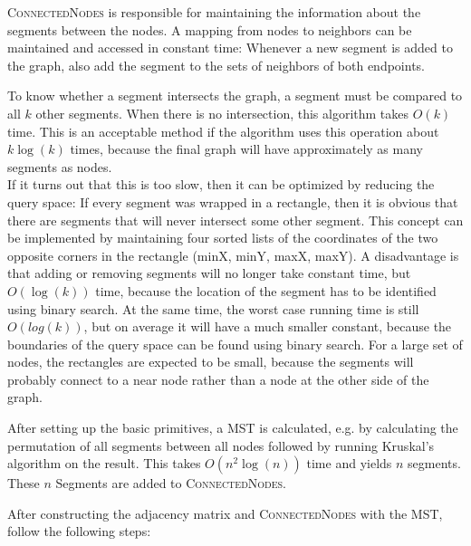 \documentclass[11pt]{article}
\begin{document}
\textsc{ConnectedNodes} is responsible for maintaining the information about the segments between the nodes. A mapping from nodes to neighbors can be maintained and accessed in constant time: Whenever a new segment is added to the graph, also add the segment to the sets of neighbors of both endpoints.

To know whether a segment intersects the graph, a segment must be compared to all $k$ other segments. When there is no intersection, this algorithm takes $O(k)$ time. This is an acceptable method if the algorithm uses this operation about $k \log(k)$ times, because the final graph will have approximately as many segments as nodes.\\
If it turns out that this is too slow, then it can be optimized by reducing the query space: If every segment was wrapped in a rectangle, then it is obvious that there are segments that will never intersect some other segment. This concept can be implemented by maintaining four sorted lists of the coordinates of the two opposite corners in the rectangle (minX, minY, maxX, maxY). A disadvantage is that adding or removing segments will no longer take constant time, but $O(\log(k))$ time, because the location of the segment has to be identified using binary search. At the same time, the worst case running time is still $O(log(k))$, but on average it will have a much smaller constant, because the boundaries of the query space can be found using binary search. For a large set of nodes, the rectangles are expected to be small, because the segments will probably connect to a near node rather than a node at the other side of the graph.

After setting up the basic primitives, a MST is calculated, e.g. by calculating the permutation of all segments between all nodes followed by running Kruskal's algorithm \cite{k-osssgtsp-56} on the result. This takes $O(n^2\log(n))$ time and yields $n$ segments. These $n$ Segments are added to \textsc{ConnectedNodes}.

After constructing the adjacency matrix and \textsc{ConnectedNodes} with the MST, follow the following steps:
\end{document}

